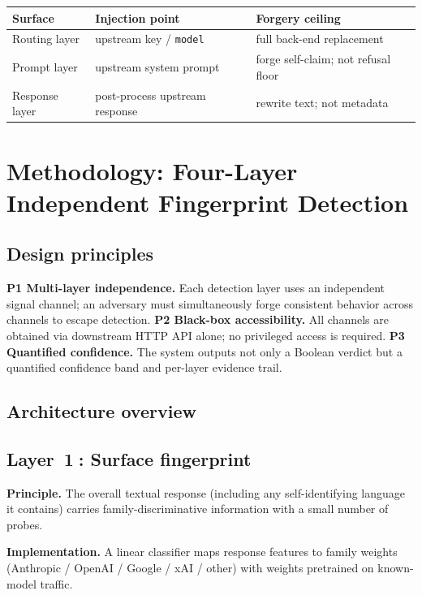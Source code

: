 \documentclass[10pt,a4paper,twocolumn]{article}
\begin{document}
\begin{table}[h]
\centering
\small
\begin{tabular}{@{}lll@{}}
\toprule
Surface & Injection point & Forgery ceiling \\
\midrule
Routing layer & upstream key / \texttt{model} & full back-end replacement \\
Prompt layer & upstream system prompt & forge self-claim; not refusal floor \\
Response layer & post-process upstream response & rewrite text; not metadata \\
\bottomrule
\end{tabular}
\end{table}

\section{Methodology: Four-Layer Independent Fingerprint Detection}\label{sec:method}

\subsection{Design principles}
\textbf{P1 Multi-layer independence.} Each detection layer uses an independent
signal channel; an adversary must simultaneously forge consistent behavior
across channels to escape detection.
\textbf{P2 Black-box accessibility.} All channels are obtained via downstream
HTTP API alone; no privileged access is required.
\textbf{P3 Quantified confidence.} The system outputs not only a Boolean
verdict but a quantified confidence band and per-layer evidence trail.

\subsection{Architecture overview}\label{sec:arch}


\subsection{Layer~\textcircled{1}: Surface fingerprint}\label{sec:layer1}
\textbf{Principle.} The overall textual response (including any
self-identifying language it contains) carries family-discriminative
information with a small number of probes.

\textbf{Implementation.} A linear classifier maps response features to family
weights (Anthropic / OpenAI / Google / xAI / other) with weights pretrained on
known-model traffic.
\end{document}
